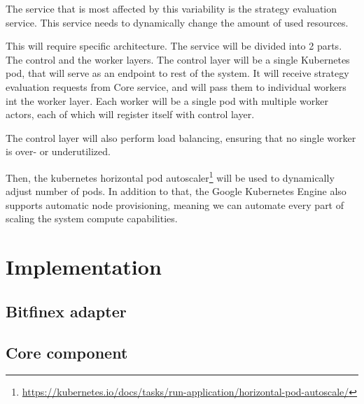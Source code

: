 The service that is most affected by this variability is the strategy evaluation service. This service needs to
dynamically change the amount of used resources.

This will require specific architecture. The service will be divided into 2 parts. The control and the worker layers.
The control layer will be a single Kubernetes pod, that will serve as an endpoint to rest of the system. It will receive
strategy evaluation requests from Core service, and will pass them to individual workers int the worker layer.
Each worker will be a single pod with multiple worker actors, each of which will register itself with control layer.

The control layer will also perform load balancing, ensuring that no single worker is over- or underutilized.



Then, the kubernetes horizontal pod autoscaler\footnote{\url{https://kubernetes.io/docs/tasks/run-application/horizontal-pod-autoscale/}} will be used to dynamically adjust number of pods. In addition to that,
the Google Kubernetes Engine also supports automatic node provisioning, meaning we can automate every part of scaling the system
compute capabilities.

\chapter{Implementation}


\section{Bitfinex adapter}


\section{Core component}

